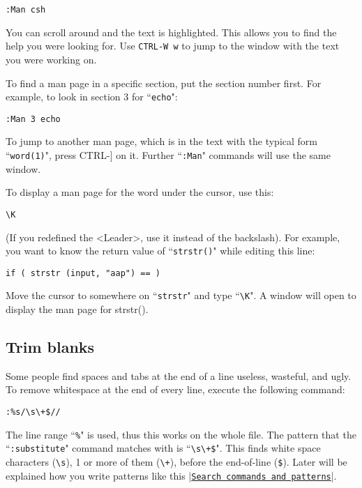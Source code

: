 \begin{Verbatim}[samepage=true]
 :Man csh
\end{Verbatim}

You can scroll around and the text is highlighted.
This allows you to find the help you were looking for.
Use \texttt{CTRL-W w} to jump to the window with the text you were working on.

To find a man page in a specific section, put the section number first.
For example, to look in section 3 for ``\texttt{echo}":

\begin{Verbatim}[samepage=true]
 :Man 3 echo
\end{Verbatim}

To jump to another man page, which is in the text with the typical form ``\texttt{word(1)}", press CTRL-] on it.
Further ``\texttt{:Man}" commands will use the same window.

To display a man page for the word under the cursor, use this:

\begin{Verbatim}[samepage=true]
 \K
\end{Verbatim}

(If you redefined the <Leader>, use it instead of the backslash).
For example, you want to know the return value of ``\texttt{strstr()}" while editing
this line:

\begin{Verbatim}[samepage=true]
    if ( strstr (input, "aap") == ) 
\end{Verbatim}

Move the cursor to somewhere on ``\texttt{strstr}" and type ``\texttt{\textbackslash{}K}".
A window will open to display the man page for strstr().
\subsection{Trim blanks}
Some people find spaces and tabs at the end of a line useless, wasteful, and ugly.
To remove whitespace at the end of every line, execute the following command:

\begin{Verbatim}[samepage=true]
 :%s/\s\+$//
\end{Verbatim}

The line range ``\texttt{\%}" is used, thus this works on the whole file.
The pattern that the ``\texttt{:substitute}" command matches with is ``\texttt{\textbackslash{}s\textbackslash{}+\$}".
This finds white space characters (\texttt{\textbackslash{}s}), 1 or more of them (\texttt{\textbackslash{}+}), before the end-of-line (\texttt{\$}).
Later will be explained how you write patterns like this |\hyperref[Search commands and patterns]{\texttt{Search commands and patterns}}|.

